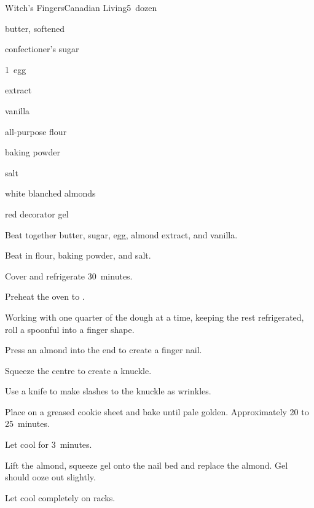 \begin{recipe}{Witch's Fingers}{Canadian Living}{5~dozen}

\begin{ingredients}
\item {} butter, softened
\item {} confectioner's sugar
\item 1~egg
\item {}  extract
\item {} vanilla
\item \C{2\threequarter} all-purpose flour
\item {} baking powder
\item {} salt
\item \C{\threequarter} white blanched almonds
\item red decorator gel
\end{ingredients}

\begin{directions}
\item Beat together butter, sugar, egg, almond extract, and vanilla.
\item Beat in flour, baking powder, and salt.
\item Cover and refrigerate 30~minutes.
\item Preheat the oven to .
\item Working with one quarter of the dough at a time, keeping the rest refrigerated, roll a spoonful into a finger shape.
\item Press an almond into the end to create a finger nail.
\item Squeeze the centre to create a knuckle.
\item Use a knife to make slashes to the knuckle as wrinkles.
\item Place on a greased cookie sheet and bake until pale golden. Approximately 20 to 25~minutes.
\item Let cool for 3~minutes.
\item Lift the almond, squeeze gel onto the nail bed and replace the almond. Gel should ooze out slightly.
\item Let cool completely on racks.
\end{directions}

\end{recipe}
